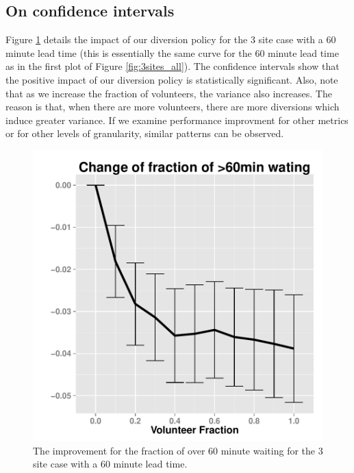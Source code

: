 \subsection{On confidence intervals}

Figure \ref{fig:ci} details the impact of our diversion policy for the 3 site
case with a 60 minute lead time (this is essentially the same
curve for the 60 minute lead time as in the first plot of Figure
\ref{fig:3sites_all}). The confidence intervals show that
the positive impact of our diversion policy is statistically
significant. Also, note that as we increase the fraction of
volunteers, the variance also increases. The reason is that,
when there are more volunteers, there are more diversions which
induce greater variance. If we examine performance improvment
for other metrics or for other levels of granularity, similar patterns
can be observed.

\begin{figure}[htp]
\centering
\includegraphics[width=.6\textwidth]{chap3/numeric/pic/ci}
\caption{The improvement for the fraction of over 60 minute waiting
for the 3 site case with a 60 minute lead time.}
\label{fig:ci}
\end{figure}
